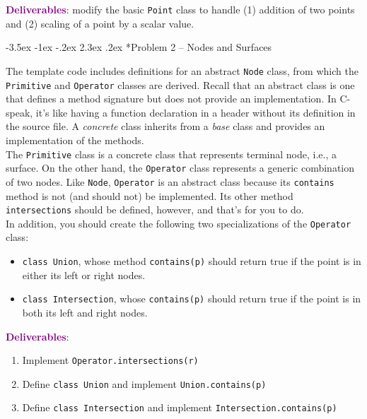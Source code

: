 \documentclass[12pt]{article}
\makeatletter
\renewcommand\section{\@startsection{section}{1}{\z@}%
                                  {-3.5ex \@plus -1ex \@minus -.2ex}%
                                  {2.3ex \@plus.2ex}%
                                  {\normalfont\bfseries}}
\makeatother
\begin{document}
{\bf \textcolor{purple}{Deliverables}}: 
modify the basic {\tt Point} class to handle (1) addition of
two points and (2) scaling of a point by a scalar value.  


\section*{Problem 2 -- Nodes and Surfaces}

The template code includes definitions for 
an abstract {\tt Node} class, from which 
the {\tt Primitive} and {\tt Operator} classes 
are derived.  Recall that an abstract class 
is one that defines a method signature but 
does not provide an implementation.  In 
C-speak, it's like having a function declaration
in a header without its definition in
the source file.  A {\it concrete} class inherits
from a {\it base} class and provides an 
implementation of the methods. \\


The {\tt Primitive} class is a concrete class 
that represents
terminal node, i.e., a surface.  On the other hand,
the  {\tt Operator} class represents a generic combination
of two nodes.  Like {\tt Node}, 
{\tt Operator} is an abstract
class because its {\tt contains} method is 
not (and should not) be implemented.  Its other 
method {\tt intersections}   should be defined,
however, and that's for you to do. \\

In addition,  you  
should create the following two specializations
of the {\tt Operator} class:
\begin{itemize}
 \item {\tt class Union}, whose method {\tt contains(p)}
       should return true if the point is in either 
       its left or right nodes.
 \item {\tt class Intersection}, whose {\tt contains(p)}
       should return true if the point is in both 
       its left and right nodes.
\end{itemize}

\vspace{12pt}
{\bf \textcolor{purple}{Deliverables}}:
\begin{enumerate}
 \item Implement {\tt Operator.intersections(r)}
 \item Define {\tt class Union} and implement {\tt Union.contains(p)}
 \item Define {\tt class Intersection} and implement {\tt Intersection.contains(p)} 
\end{enumerate}
\end{document}
